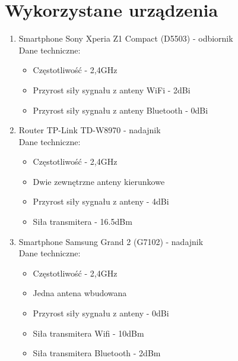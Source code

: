 \section{Wykorzystane urządzenia}
\begin{enumerate}
	\item Smartphone Sony Xperia Z1 Compact (D5503) - odbiornik\\				
	Dane techniczne:
	\begin{itemize}
		\item Częstotliwość - 2,4GHz
		\item Przyrost siły sygnału z anteny WiFi - 2dBi
		\item Przyrost siły sygnału z anteny Bluetooth - 0dBi
	\end{itemize}
	\item Router TP-Link TD-W8970 - nadajnik\\
	Dane techniczne:
	\begin{itemize}
		\item Częstotliwość - 2,4GHz
		\item Dwie zewnętrzne anteny kierunkowe
		\item Przyrost siły sygnału z anteny - 4dBi
		\item Siła transmitera - 16.5dBm					
	\end{itemize}
	\item Smartphone Samsung Grand 2 (G7102) - nadajnik\\
	Dane techniczne:
	\begin{itemize}
		\item Częstotliwość - 2,4GHz
		\item Jedna antena wbudowana
		\item Przyrost siły sygnału z anteny - 0dBi
		\item Siła transmitera Wifi - 10dBm
		\item Siła transmitera Bluetooth - 2dBm				
	\end{itemize}
\end{enumerate}
